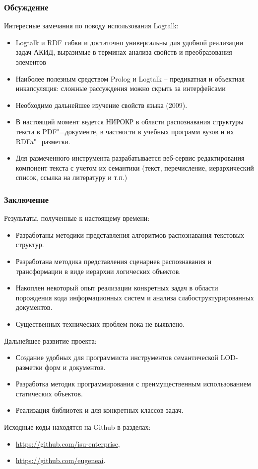 \documentclass[10pt]{beamer}
\begin{document}
\begin{frame}
  \frametitle{Обсуждение}
  Интересные замечания по поводу использования Logtalk:
  \begin{itemize}
  \item Logtalk и RDF гибки и достаточно универсальны для удобной реализации задач АКИД, выразимые в терминах анализа свойств и преобразования элементов
  \item Наиболее полезным средством Prolog и Logtalk -- предикатная и объектная инкапсуляция: сложные рассуждения можно скрыть за интерфейсами
  \item Необходимо дальнейшее изучение свойств языка (2009).
  \end{itemize}

  \begin{itemize}
  \item {\color{mymauve} В настоящий момент ведется НИРОКР в области распознавания структуры текста в PDF"=документе, в частности в учебных программ вузов и их RDFa"=разметки.}
  \item {\color{mymauve} Для размеченного инструмента разрабатывается веб-сервис редактирования компонент текста с учетом их семантики (текст, перечисление, иерархический список, ссылка на литературу и т.п.)}
  \end{itemize}
\end{frame}

\begin{frame}
  \frametitle{Заключение}
  Результаты, полученные к настоящему времени:
  \begin{itemize}
  \item Разработаны методики представления алгоритмов распознавания текстовых структур.
  \item Разработана методика представления сценариев распознавания и трансформации в виде иерархии логических объектов.
  \item Накоплен некоторый опыт реализации конкретных задач в области порождения кода информационных систем и анализа слабоструктурированных документов.
  \item Существенных технических проблем пока не выявлено.
  \end{itemize}
  Дальнейшее развитие проекта:
  \begin{itemize}
  \item Создание удобных для программиста инструментов семантической LOD-разметки форм и документов.
  \item Разработка методик программирования с преимущественным использованием статических объектов.
  \item Реализация библиотек и для конкретных классов задач.
  \end{itemize}
  Исходные коды находятся на Github в разделах:
  \begin{itemize}
  \item \url{https://github.com/isu-enterprise},
  \item \url{https://github.com/eugeneai}.
  \end{itemize}
\end{frame}
\end{document}
